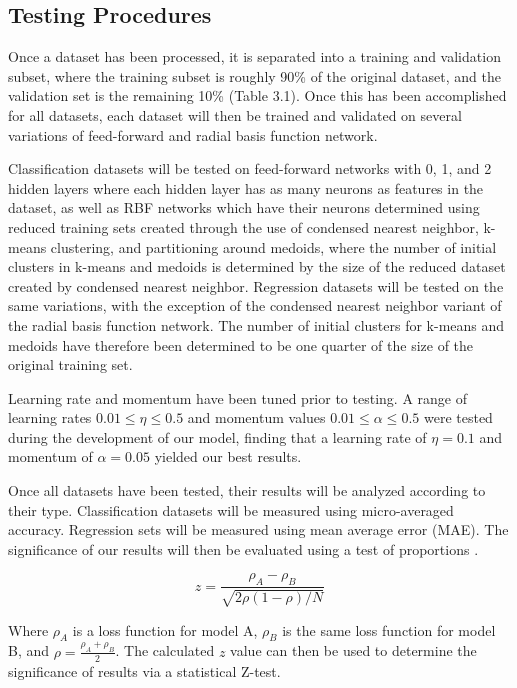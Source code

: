 \subsection{Testing Procedures}
Once a dataset has been processed, it is separated into a training and validation subset, where the training subset is roughly 90\% of the original dataset, and the validation set is the remaining 10\% (Table 3.1). Once this has been accomplished for all datasets, each dataset will then be trained and validated on several variations of feed-forward and radial basis function network. 

Classification datasets will be tested on feed-forward networks with 0, 1, and 2 hidden layers where each hidden layer has as many neurons as features in the dataset, as well as RBF networks which have their neurons determined using reduced training sets created through the use of condensed nearest neighbor, k-means clustering, and partitioning around medoids, where the number of initial clusters in k-means and medoids is determined by the size of the reduced dataset created by condensed nearest neighbor. Regression datasets will be tested on the same variations, with the exception of the condensed nearest neighbor variant of the radial basis function network. The number of initial clusters for k-means and medoids have therefore been determined to be one quarter of the size of the original training set. 

Learning rate and momentum have been tuned prior to testing. A range of learning rates $0.01 \leq \eta \leq 0.5$ and momentum values $0.01 \leq \alpha \leq 0.5$ were tested during the development of our model, finding that a learning rate of $\eta = 0.1$ and momentum of $\alpha = 0.05$ yielded our best results.

Once all datasets have been tested, their results will be analyzed according to their type. Classification datasets will be measured using micro-averaged accuracy. Regression sets will be measured using mean average error (MAE)\citep{Chai2014}. The significance of our results will then be evaluated using a test of proportions \citep{Dietterich1997}.

\begin{equation}
	z = \frac{\rho_A - \rho_B}{\sqrt{2\rho(1 - \rho) / N}}
\end{equation}

\bigbreak
Where $\rho_A$ is a loss function for model A, $\rho_B$ is the same loss function for model B, and $\rho = \frac{\rho_A + \rho_B}{2}$. The calculated $z$ value can then be used to determine the significance of results via a statistical Z-test.

